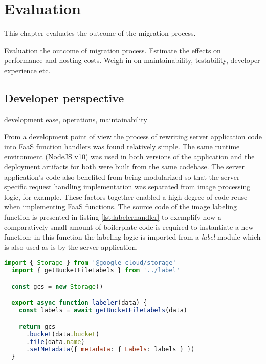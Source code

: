 \chapter{Evaluation} \label{cha:evaluation}

This chapter evaluates the outcome of the migration process.

Evaluation the outcome of migration process. Estimate the effects on performance and hosting costs. Weigh in on maintainability, testability, developer experience etc.

\section{Developer perspective}

development ease, operations, maintainability

From a development point of view the process of rewriting server application code into FaaS function handlers was found relatively simple. The same runtime environment (NodeJS v10) was used in both versions of the application and the deployment artifacts for both were built from the same codebase. The server application's code also benefited from being modularized so that the server-specific request handling implementation was separated from image processing logic, for example. These factors together enabled a high degree of code reuse when implementing FaaS functions. The source code of the image labeling function is presented in listing \ref{lst:labelerhandler} to exemplify how a comparatively small amount of boilerplate code is required to instantiate a new function: in this function the labeling logic is imported from a \textit{label} module which is also used as-is by the server application.

\begin{lstlisting}[language=JavaScript,caption=Image labeler function handler,captionpos=b,label=lst:labelerhandler,showstringspaces=false,belowskip=2em,frame=tb,aboveskip=2em]
  import { Storage } from '@google-cloud/storage'
  import { getBucketFileLabels } from '../label'

  const gcs = new Storage()

  export async function labeler(data) {
    const labels = await getBucketFileLabels(data)

    return gcs
      .bucket(data.bucket)
      .file(data.name)
      .setMetadata({ metadata: { Labels: labels } })
  }
\end{lstlisting}

